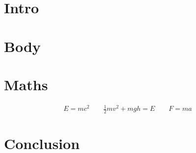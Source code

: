\documentclass{article}
\begin{document}
\section{Intro}
	\lipsum[2]
\section{Body}
	\lipsum
\section{Maths}
	\begin{align*}
		E = mc^2 \qquad \frac{1}{2}mv^2 + mgh = E \qquad F = ma
	\end{align*}
\section{Conclusion}
	\lipsum[1]
\end{document}
